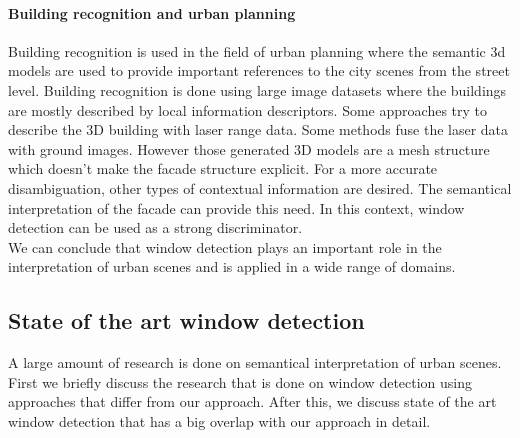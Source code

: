 \paragraph{Building recognition and urban planning}
	Building recognition is used in the field of urban planning where the semantic 3d
	models are used to provide important references to the city scenes from the
	street level.
	Building recognition is done using large image datasets where the
	buildings are mostly described by local information descriptors.  
	Some approaches try to describe the 3D building with laser range data. Some methods fuse the laser data with
	ground images. However those generated 3D models are a mesh structure which doesn't make the facade structure explicit.
	For a more accurate disambiguation, other types of contextual information are
	desired.  The semantical interpretation of the facade can provide this need.
	In this context, window detection can be used as a strong discriminator.\\



We can conclude that window detection plays an important role in the
interpretation of urban scenes and is applied in a wide range of domains.  



\subsection{State of the art window detection} %
A large amount of research is done on semantical interpretation of urban scenes. 
First we briefly discuss the research that is done on window detection using
approaches that differ from our approach.  After this, we discuss state of the art
window detection that has a big overlap with our approach in detail.\\

